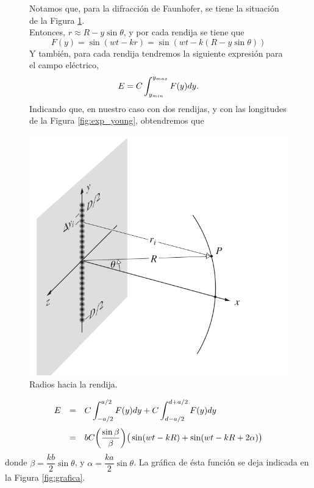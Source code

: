 \documentclass[12pt,a4paper]{article}
\begin{document}
\begin{figure}[hbtp!]
	\begin{minipage}{0.5\linewidth}
	Notamos que, para la difracción de Faunhofer, se tiene la situación de la Figura \ref{fig:radios}. \\[2mm]
	Entonces, \(r \approx R - y \sin \theta\), y por cada rendija se tiene que 
		\[
			F(y) = \sin (wt- kr) = \sin (wt-k(R - y \sin \theta))
		\]
		Y también, para cada rendija tendremos la siguiente expresión para el campo eléctrico,
		\[
			E = C \displaystyle\int _{y_{min}} ^{y_{max}} F(y) dy.
		\]
		Indicando que, en nuestro caso con dos rendijas, y con las longitudes de la Figura \ref{fig:exp_young}, obtendremos que
	\end{minipage}\hspace{5mm}
	\begin{minipage}{0.5\linewidth}
	\centering
	\includegraphics[width= 0.8 \linewidth]{1_INTRO/fran}
	\caption{Radios hacia la rendija.}
	\label{fig:radios}
	\end{minipage}
\end{figure}
\begin{equation}
	\begin{array}{rcl}
		E & = & C \displaystyle\int _{-a/2} ^{a/2} F(y) dy + C \displaystyle\int _{d-a/2} ^{d+a/2} F(y) dy\\[5mm]
		& = & bC \bigg(\dfrac{\sin \beta}{\beta}\bigg) \big(\sin (wt-kR) + \sin (wt-kR + 2\alpha)\big)
	\end{array}
	\label{eq:campo_electrico}
\end{equation}
donde \(\beta = \dfrac{kb}{2} \sin \theta\), y \(\alpha = \dfrac{ka}{2} \sin \theta\). La gráfica de ésta función se deja indicada en la Figura \ref{fig:grafica}. 
\end{document}

